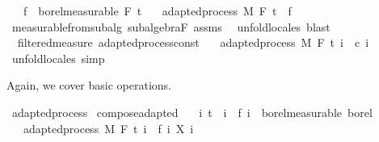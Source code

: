 \begin{isabellebody}
\ \ \ {\isachardoublequoteopen}f\ {\isasymin}\ borel{\isacharunderscore}{\kern0pt}measurable\ {\isacharparenleft}{\kern0pt}F\ t\isanewline
\ \ \ {\isachardoublequoteopen}adapted{\isacharunderscore}{\kern0pt}process\ M\ F\ t\ {\isacharparenleft}{\kern0pt}{\isasymlambda}{\isacharunderscore}{\kern0pt}{\isachardot}{\kern0pt}\ f{\isacharparenright}{\kern0pt}{\isachardoublequoteclose}\isanewline
%
\isadelimproof
\ \ %
\endisadelimproof
%
\isatagproof
{}\isamarkupfalse%
\ measurable{\isacharunderscore}{\kern0pt}from{\isacharunderscore}{\kern0pt}subalg\ subalgebra{\isacharunderscore}{\kern0pt}F\ assms\ \isamarkupfalse%
\ {\isacharparenleft}{\kern0pt}unfold{\isacharunderscore}{\kern0pt}locales{\isacharparenright}{\kern0pt}\ blast%
\endisatagproof
{\isafoldproof}%
%
\isadelimproof
\isanewline
%
\endisadelimproof
\isanewline
{}\isamarkupfalse%
\ {\isacharparenleft}{\kern0pt}\ filtered{\isacharunderscore}{\kern0pt}measure{\isacharparenright}{\kern0pt}\ adapted{\isacharunderscore}{\kern0pt}process{\isacharunderscore}{\kern0pt}const{\isacharcolon}{\kern0pt}\isanewline
\ \ \ {\isachardoublequoteopen}adapted{\isacharunderscore}{\kern0pt}process\ M\ F\ t\ {\isacharparenleft}{\kern0pt}{\isasymlambda}i\ {\isacharunderscore}{\kern0pt}{\isachardot}{\kern0pt}\ c\ i{\isacharparenright}{\kern0pt}{\isachardoublequoteclose}%
\isadelimproof
\ %
\endisadelimproof
%
\isatagproof
{}\isamarkupfalse%
\ {\isacharparenleft}{\kern0pt}unfold{\isacharunderscore}{\kern0pt}locales{\isacharparenright}{\kern0pt}\ simp%
\endisatagproof
{\isafoldproof}%
%
\isadelimproof
%
\endisadelimproof
%
\begin{isamarkuptext}%
Again, we cover basic operations.%
\end{isamarkuptext}\isamarkuptrue%
\isamarkupfalse%
\ adapted{\isacharunderscore}{\kern0pt}process\isanewline
{}\isanewline
\isanewline
{}\isamarkupfalse%
\ compose{\isacharunderscore}{\kern0pt}adapted{\isacharcolon}{\kern0pt}\isanewline
\ \ \ {\isachardoublequoteopen}{\isasymAnd}i{\isachardot}{\kern0pt}\ t\ {\isasymle}\ i\ {\isasymLongrightarrow}\ f\ i\ {\isasymin}\ borel{\isacharunderscore}{\kern0pt}measurable\ borel{\isachardoublequoteclose}\isanewline
\ \ \ {\isachardoublequoteopen}adapted{\isacharunderscore}{\kern0pt}process\ M\ F\ t\ {\isacharparenleft}{\kern0pt}{\isasymlambda}i\ {\isasymxi}{\isachardot}{\kern0pt}\ {\isacharparenleft}{\kern0pt}f\ i{\isacharparenright}{\kern0pt}\ {\isacharparenleft}{\kern0pt}X\ i\ {\isasymxi}{\isacharparenright}{\kern0pt}{\isacharparenright}{\kern0pt}{\isachardoublequoteclose}\isanewline

\end{isabellebody}

